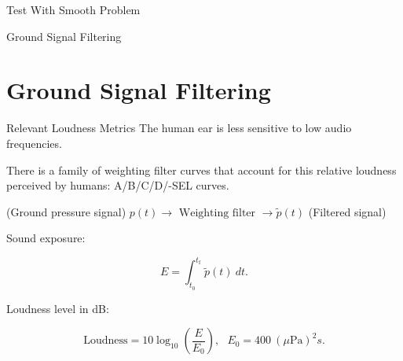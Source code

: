 \documentclass{beamer}
\newcounter{sectionframes}
\newcommand{\setsectionframes}[1]{%
  \setcounter{sectionframes}{#1}%
}
\newcounter{sectionframecount}
\begin{document}
\begin{frame}[t]{Test With Smooth Problem}

\end{frame}


\begin{frame}[plain]
  \vfill
  \centering
  {Ground Signal Filtering}
  \vfill
\end{frame}


\section{Ground Signal Filtering}

\setsectionframes{3}


\begin{frame}[t]{Relevant Loudness Metrics}
The human ear is less sensitive to low audio frequencies.

\vspace{10pt}
There is a family of weighting filter curves that account for this relative loudness perceived by humans: A/B/C/D/-SEL curves.

\vspace{10pt}
(Ground pressure signal) $p(t)\to \text{ Weighting filter }\to \tilde{p}(t)$ (Filtered signal)

\vspace{10pt}
Sound exposure:

\begin{equation}
  E = \int_{t_0}^{t_{\text{f}}} \tilde{p}(t)~dt.
\end{equation}

\vspace{10pt}
Loudness level in dB:

\begin{equation}
  \text{Loudness} = 10\log_{10}\left(\dfrac{E}{E_0}\right),~~~ E_0 = 400~ (\mu\text{Pa})^2s.
\end{equation}

\end{frame}
\end{document}

